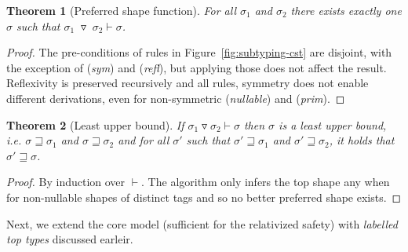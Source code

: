 \documentclass[10pt,preprint,blind,clearpagebib]{sigplanconf}
\newcommand{\kvd}[1]{\textnormal{\textcolor{kvdclr}{\sffamily #1}}}
\newcommand{\tsep}[0]{\; \triangledown \;}
\newtheorem{theorem}{Theorem}
\begin{document}
\begin{theorem}[Preferred shape function]
\label{thm:func}
For all $\sigma_1$ and $\sigma_2$ there exists exactly one $\sigma$ such that 
$\sigma_1 \tsep \sigma_2 \vdash \sigma$. 
\end{theorem}
\begin{proof}
The pre-conditions of rules in Figure~\ref{fig:subtyping-cst} are disjoint, with the exception 
of (\emph{sym}) and (\emph{refl}), but applying those does not affect the result. Reflexivity is
preserved recursively and all rules, symmetry does not enable different derivations, even for
non-symmetric (\emph{nullable}) and (\emph{prim}).
\end{proof}

\begin{theorem}[Least upper bound]
\label{thm:lub}
If $\sigma_1 \triangledown \sigma_2 \vdash \sigma$ then $\sigma$ is a least upper bound, i.e. 
$\sigma \sqsupseteq \sigma_1$ and $\sigma \sqsupseteq \sigma_2$ and for all $\sigma'$ such that $\sigma' \sqsupseteq \sigma_1$
and $\sigma' \sqsupseteq \sigma_2$, it holds that $\sigma' \sqsupseteq \sigma$.
\end{theorem}
\begin{proof}
By induction over $\vdash$. The algorithm only infers the top shape \kvd{any} when for non-nullable
shapes of distinct tags and so no better preferred shape exists.
\end{proof}

\noindent
Next, we extend the core model (sufficient for the relativized safety) 
with \emph{labelled top types} discussed earleir.

\end{document}
